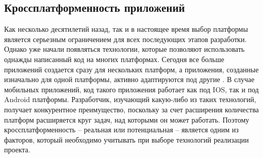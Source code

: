 \subsection{Кроссплатформенность приложений} 
\label{sec:analysis:literature:crossplatform}

Как несколько десятилетий назад, так и в настоящее время выбор платформы является серьезным ограничением для всех последующих этапов разработки. Однако уже начали появляться технологии, которые позволяют использовать однажды написанный код на многих платформах. Сегодня все больше приложений создается сразу для нескольких платформ, а приложения, созданные изначально для одной платформы, активно адаптируются под другие \cite{crossplatform}. В случае мобильных приложений, код такого приложения работает как под IOS, так и под Android платформы. Разработчик, изучающий какую-либо из таких технологий, получает конкурентное преимущество, поскольку за счет расширения количества платформ расширяется круг задач, над которыми он может работать. Поэтому кроссплатформенность -- реальная или потенциальная -- является одним из факторов, который необходимо учитывать при выборе технологий реализации проекта.
